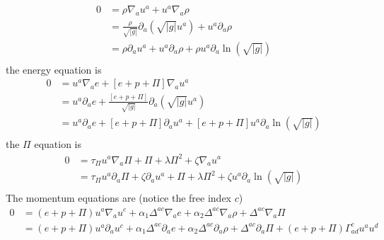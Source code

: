 \documentclass[12pt]{article}
\numberwithin{equation}{section}
\begin{document}
\begin{equation}
\begin{aligned}
0 &= \rho \nabla_{a} u^a + u^a \nabla_{a} \rho \\
&= \frac{\rho}{\sqrt{|g|}} \partial_{a} (\sqrt{|g|} u^a) + u^a \partial_{a} \rho \\
&= \rho \partial_{a} u^a + u^a \partial_{a} \rho + \rho u^a \partial_{a} \ln(\sqrt{|g|}) \\
\end{aligned}
\end{equation}
the energy equation is
\begin{equation}
\begin{aligned}
0 &= u^a \nabla_{a} e + [e + p + \Pi] \nabla_{a} u^a \\
&= u^a \partial_{a} e + \frac{[e + p + \Pi]}{\sqrt{|g|}} \partial_{a} (\sqrt{|g|} u^a) \\
&= u^a \partial_{a} e + [e + p + \Pi] \partial_{a} u^a + [e + p + \Pi] u^a \partial_{a} \ln(\sqrt{|g|}) \\
\end{aligned}
\end{equation}
the $\Pi$ equation is
\begin{equation}
\begin{aligned}
0 &= \tau_{\Pi} u^a \nabla_a \Pi + \Pi + \lambda \Pi^2 + \zeta \nabla_a u^a \\
&= \tau_{\Pi} u^a \partial_a \Pi + \zeta \partial_a u^a + \Pi + \lambda \Pi^2 + \zeta u^a \partial_a \ln(\sqrt{|g|}) \\
\end{aligned}
\end{equation}
The momentum equations are (notice the free index $c$)
\begin{equation}
\begin{aligned}
0 &= (e + p + \Pi) u^a \nabla_{a} u^c + \alpha_1 \Delta^{ac} \nabla_a e + \alpha_2 \Delta^{ac} \nabla_a \rho + \Delta^{ac} \nabla_{a} \Pi \\
&= (e + p + \Pi) u^a \partial_{a} u^c + \alpha_1 \Delta^{ac} \partial_a e + \alpha_2 \Delta^{ac} \partial_a \rho + \Delta^{ac} \partial_{a} \Pi + (e + p + \Pi) \Gamma^{c}_{ad} u^a u^d \\
\end{aligned}
\end{equation}
\end{document}
